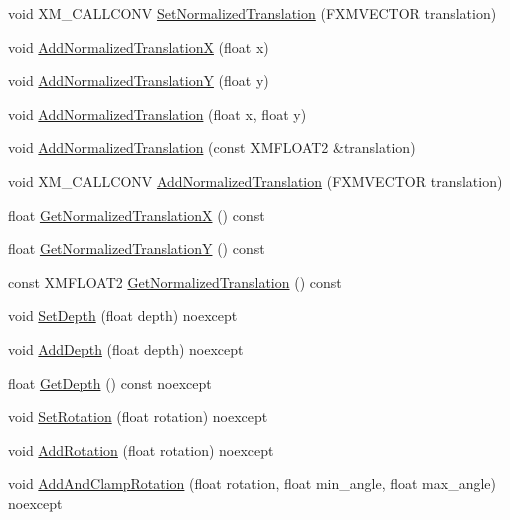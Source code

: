 \begin{DoxyCompactItemize}
\item 
void X\+M\+\_\+\+C\+A\+L\+L\+C\+O\+NV \hyperlink{structmage_1_1_sprite_transform_af72bc622e7512910e5a9ceb8aeeec22d}{Set\+Normalized\+Translation} (F\+X\+M\+V\+E\+C\+T\+OR translation)
\item 
void \hyperlink{structmage_1_1_sprite_transform_a4db6aebc7dedf0c38599d4cb989c62fc}{Add\+Normalized\+TranslationX} (float x)
\item 
void \hyperlink{structmage_1_1_sprite_transform_aead38398d2cbeb60e664beb38065b6fc}{Add\+Normalized\+TranslationY} (float y)
\item 
void \hyperlink{structmage_1_1_sprite_transform_a10e6758142d3cbfa2192dd04530fca62}{Add\+Normalized\+Translation} (float x, float y)
\item 
void \hyperlink{structmage_1_1_sprite_transform_ad5d6e1ab0012287f6ee52d19426ed6cf}{Add\+Normalized\+Translation} (const X\+M\+F\+L\+O\+A\+T2 \&translation)
\item 
void X\+M\+\_\+\+C\+A\+L\+L\+C\+O\+NV \hyperlink{structmage_1_1_sprite_transform_a167f79e773eeb4dca46915f748726113}{Add\+Normalized\+Translation} (F\+X\+M\+V\+E\+C\+T\+OR translation)
\item 
float \hyperlink{structmage_1_1_sprite_transform_a3fa25fbd159023a4329790d69d679f1e}{Get\+Normalized\+TranslationX} () const
\item 
float \hyperlink{structmage_1_1_sprite_transform_ab44870b6b7ccf7de347fd4bc82fb65ae}{Get\+Normalized\+TranslationY} () const
\item 
const X\+M\+F\+L\+O\+A\+T2 \hyperlink{structmage_1_1_sprite_transform_a35b4a512d853e08743948f8065d1558f}{Get\+Normalized\+Translation} () const
\item 
void \hyperlink{structmage_1_1_sprite_transform_af3aea2d2ea78a55bddaf6f73bcebff4f}{Set\+Depth} (float depth) noexcept
\item 
void \hyperlink{structmage_1_1_sprite_transform_a837bad424323a5785fe76c6db130e75c}{Add\+Depth} (float depth) noexcept
\item 
float \hyperlink{structmage_1_1_sprite_transform_ab1338e06ab2f073387675a9f1adbfd10}{Get\+Depth} () const noexcept
\item 
void \hyperlink{structmage_1_1_sprite_transform_a95bfa3a9ef80d42682c41f663b818698}{Set\+Rotation} (float rotation) noexcept
\item 
void \hyperlink{structmage_1_1_sprite_transform_a04ac9e579968e80b4e42ad6224ff78a5}{Add\+Rotation} (float rotation) noexcept
\item 
void \hyperlink{structmage_1_1_sprite_transform_a52adebefc829bcfff5e30621ad1d571a}{Add\+And\+Clamp\+Rotation} (float rotation, float min\+\_\+angle, float max\+\_\+angle) noexcept

\end{DoxyCompactItemize}
